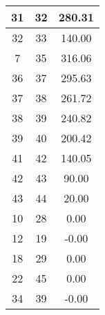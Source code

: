\begin{table}[H]
\begin{minipage}{.5\linewidth}
\begin{tabular}{|c|c|c|}
            31 &  32 &  280.31\\ \hline
            32 &  33 &  140.00\\ \hline
             7 &  35 &  316.06\\ \hline
            36 &  37 &  295.63\\ \hline
            37 &  38 &  261.72\\ \hline
            38 &  39 &  240.82\\ \hline
            39 &  40 &  200.42\\ \hline
            41 &  42 &  140.05\\ \hline
            42 &  43 &   90.00\\ \hline
            43 &  44 &   20.00\\ \hline
            10 &  28 &    0.00\\ \hline
            12 &  19 &   -0.00\\ \hline
            18 &  29 &    0.00\\ \hline
            22 &  45 &    0.00\\ \hline
            34 &  39 &   -0.00\\ \hline        
        \end{tabular}
    \end{minipage} 
\end{table}


  


